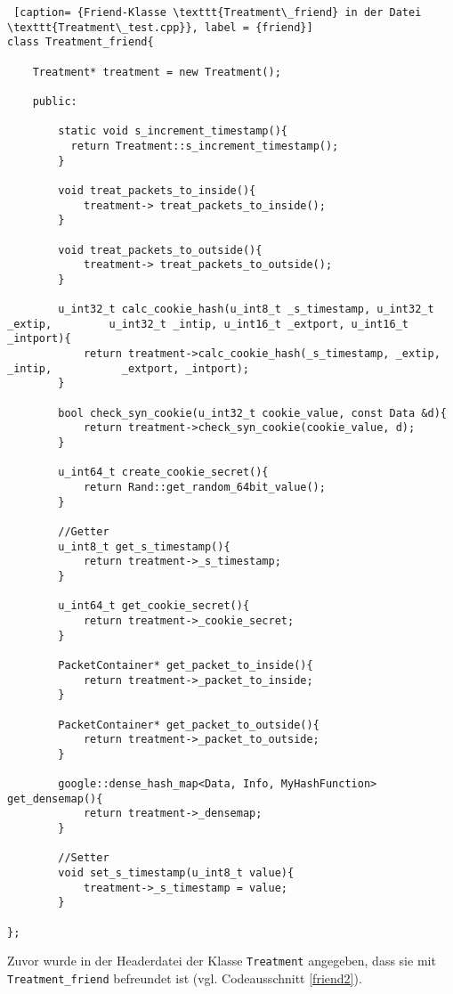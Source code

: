 \documentclass[../review_3.tex]{subfiles}
\begin{document}
\begin{lstlisting} [caption= {Friend-Klasse \texttt{Treatment\_friend} in der Datei \texttt{Treatment\_test.cpp}}, label = {friend}]
class Treatment_friend{
    
    Treatment* treatment = new Treatment();
    
    public:
    
        static void s_increment_timestamp(){
          return Treatment::s_increment_timestamp();
        }
        
        void treat_packets_to_inside(){
            treatment-> treat_packets_to_inside();
        }
    
        void treat_packets_to_outside(){
            treatment-> treat_packets_to_outside();
        }
    
        u_int32_t calc_cookie_hash(u_int8_t _s_timestamp, u_int32_t _extip,         u_int32_t _intip, u_int16_t _extport, u_int16_t _intport){
            return treatment->calc_cookie_hash(_s_timestamp, _extip, _intip,           _extport, _intport);
        }
    
        bool check_syn_cookie(u_int32_t cookie_value, const Data &d){
            return treatment->check_syn_cookie(cookie_value, d);
        }
    
        u_int64_t create_cookie_secret(){
            return Rand::get_random_64bit_value();
        }

        //Getter
        u_int8_t get_s_timestamp(){
            return treatment->_s_timestamp;
        }

        u_int64_t get_cookie_secret(){
            return treatment->_cookie_secret;
        }

        PacketContainer* get_packet_to_inside(){
            return treatment->_packet_to_inside;
        }

        PacketContainer* get_packet_to_outside(){
            return treatment->_packet_to_outside;
        }
    
        google::dense_hash_map<Data, Info, MyHashFunction> get_densemap(){
            return treatment->_densemap;
        }

        //Setter
        void set_s_timestamp(u_int8_t value){
            treatment->_s_timestamp = value;
        }

};\end{lstlisting}

Zuvor wurde in der Headerdatei der Klasse \texttt{Treatment} angegeben, dass sie mit \texttt{Treatment\_friend} befreundet ist (vgl. Codeausschnitt \ref{friend2}).
\end{document}
